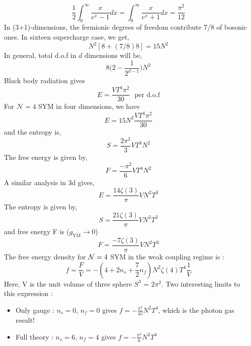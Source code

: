 \begin{equation}
    \frac{1}{2}\int_{0}^{\infty} \frac{x}{e^{x} -1} dx = 
    \int_{0}^{\infty} \frac{x}{e^{x}+1} dx = \frac{\pi^2}{12}
\end{equation}
In (3+1)-dimensions, the fermionic degrees of freedom contribute 7/8 of bosonic ones. In sixteen supercharge case, 
we get,  
\begin{equation}
N^2 \left[ 8 + (7/8)8 \right] = 15N^2
\end{equation}
In general, total d.o.f in $d$ dimensions will be, 
\begin{equation}
8 \Big( 2 - \frac{1}{2^{d-1}}\Big) N^2
\end{equation}
Black body radiation gives 
\begin{equation} 
E = \frac{VT^4 \pi^2}{30} ~~~\text{per d.o.f}
\end{equation} 
For $\mathcal{N}=4$ SYM in four dimensions, we have 
\begin{equation} 
E = 15N^2 \frac{VT^4 \pi^2}{30} 
\end{equation} 
and the entropy is,  
\begin{equation} 
S = \frac{2\pi^2}{3} VT^3N^2 
\end{equation} 
The free energy is given by, 
\begin{equation}
F = \frac{-\pi^2}{6} VT^4N^2 
\end{equation} 
A similar analysis in 3d gives, 
\begin{equation}
E =  \frac{14\zeta(3)}{\pi}VN^2T^3 
\end{equation} 
The entropy is given by,  
\begin{equation}
S = \frac{21\zeta(3)}{\pi}VN^2T^2
\end{equation} 
and free energy F is ($g_{\text{YM}} \to 0$) 
\begin{equation}
F = \frac{-7\zeta(3)}{\pi}VN^2T^3
\end{equation} 
The free energy density for ${\cal N}=4$  SYM in the weak coupling regime is :
\begin{equation}
    f = \frac{F}{V} = - \left(4 + 2n_{s} + \frac{7}{2} n_{f}\right) N^{2} \zeta(4) T^{4} \frac{1}{V} 
\end{equation}
Here, V is the unit volume of three sphere $S^{3}$ = $2\pi^2$. 
Two interesting limits to this expression :
\begin{itemize}
\item Only gauge : $n_{s} = 0$, $n_{f} = 0$ gives $f = - \frac{\pi^2}{45} N^{2}T^{4}$, which is the photon gas result! 
\item Full theory : $n_{s} = 6$, $n_{f} = 4$ gives $f = - \frac{\pi^2}{6} N^{2}T^{4}$
\end{itemize}

